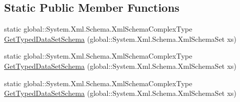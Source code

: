 \subsection*{Static Public Member Functions}
\begin{DoxyCompactItemize}
\item 
static global\+::\+System.\+Xml.\+Schema.\+Xml\+Schema\+Complex\+Type \hyperlink{class_env_int_1_1_win32_1_1_field_tech_1_1_manager_1_1_data_sets_1_1_guide_ware_mobile_data_set_a7763c71301d5ee5a485e53eecb8e7439}{Get\+Typed\+Data\+Set\+Schema} (global\+::\+System.\+Xml.\+Schema.\+Xml\+Schema\+Set xs)
\item 
static global\+::\+System.\+Xml.\+Schema.\+Xml\+Schema\+Complex\+Type \hyperlink{class_env_int_1_1_win32_1_1_field_tech_1_1_manager_1_1_data_sets_1_1_guide_ware_mobile_data_set_a7763c71301d5ee5a485e53eecb8e7439}{Get\+Typed\+Data\+Set\+Schema} (global\+::\+System.\+Xml.\+Schema.\+Xml\+Schema\+Set xs)
\item 
static global\+::\+System.\+Xml.\+Schema.\+Xml\+Schema\+Complex\+Type \hyperlink{class_env_int_1_1_win32_1_1_field_tech_1_1_manager_1_1_data_sets_1_1_guide_ware_mobile_data_set_a7763c71301d5ee5a485e53eecb8e7439}{Get\+Typed\+Data\+Set\+Schema} (global\+::\+System.\+Xml.\+Schema.\+Xml\+Schema\+Set xs)
\end{DoxyCompactItemize}
